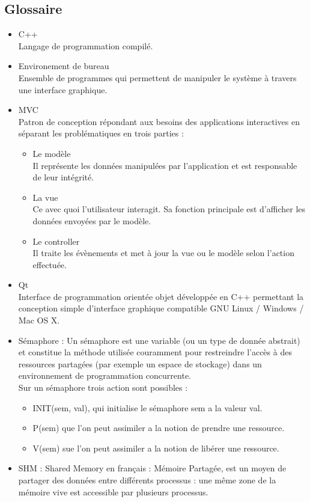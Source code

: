 \documentclass{../res/univ-projet}
\begin{document}
  \subsection{Glossaire}
    \begin{itemize}
      \item C++\\
        Langage de programmation compilé.
      \item Environement de bureau\\
        Ensemble de programmes qui permettent de manipuler le système à travers une interface graphique.
      \item MVC\\
        Patron de conception répondant aux besoins des applications interactives en séparant les problématiques en trois parties :
        \begin{itemize}
          \item Le modèle\\
            Il représente les données manipulées par l'application et est responsable de leur intégrité.
          \item La vue\\
            Ce avec quoi l'utilisateur interagit. Sa fonction principale est d'afficher les données envoyées par le modèle.
          \item Le controller\\
            Il traite les évènements et met à jour la vue ou le modèle selon l'action effectuée.
        \end{itemize}
      \item Qt\\
        Interface de programmation orientée objet développée en C++ permettant la conception simple d'interface graphique compatible GNU Linux / Windows / Mac OS X.
      \item Sémaphore : Un sémaphore est une variable (ou un type de donnée abstrait)
            et constitue la méthode utilisée couramment pour restreindre l'accès à des
            ressources partagées (par exemple un espace de stockage) dans un environnement
            de programmation concurrente.\\
            Sur un sémaphore trois action sont possibles :
            \begin{itemize}
               \item INIT(sem, val), qui initialise le sémaphore sem a la valeur val.
               \item P(sem) que l'on peut assimiler a la notion de prendre une ressource.
               \item V(sem) sue l'on peut assimiler a la notion de libérer une ressource.
             \end{itemize} 
      \item SHM : Shared Memory en français : Mémoire Partagée,
            est un moyen de partager des données entre différents processus :
            une même zone de la mémoire vive est accessible par plusieurs processus.
    \end{itemize}
\end{document}
